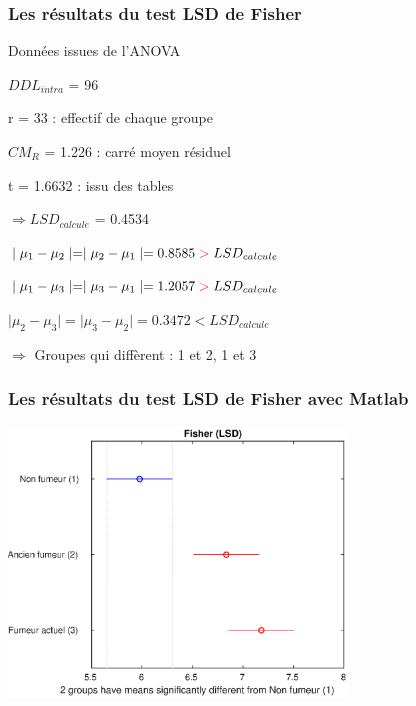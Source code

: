 \documentclass{beamer}
\begin{document}
\begin{frame}
	\frametitle{Les résultats du test LSD de Fisher}
	
	\begin{block}{Données issues de l'ANOVA}
		\begin{itemize}
			\item[•] $DDL_{intra}$ = 96 
			\item[•] r = 33 : effectif de chaque groupe
			\item[•] $CM_R$ = 1.226 : carré moyen résiduel
			\item[•]  t = 1.6632 : issu des tables
			\begin{center}
				\item[] $\Rightarrow LSD_{calcule}$ = 0.4534
			\end{center}
			
		\end{itemize}
	\end{block}
	
	\begin{itemize}	
	  \item[•] $\mid{\mu_1-\mu_2}\mid = \mid{\mu_2-\mu_1}\mid = 0.8585 \color{red} > \color{black} LSD_{calcule}$ \\
	  \item[•] $\mid{\mu_1-\mu_3}\mid = \mid{\mu_3-\mu_1}\mid = 1.2057 \color{red} > \color{black} LSD_{calcule}$ \\
	  \item[•] $\mid{\mu_2-\mu_3}\mid = \mid{\mu_3-\mu_2}\mid = 0.3472 < LSD_{calcule}$ \\
	  \begin{center}
	    \item[] $\Rightarrow $ Groupes qui diffèrent : 1 et 2, 1 et 3 \\
	  \end{center}
	\end{itemize}
\end{frame}

\begin{frame}
	\frametitle{Les résultats du test LSD de Fisher avec Matlab}
	
	\centerline{\includegraphics[width=9cm]{Images/FisherLSD}}
\end{frame}
\end{document}
